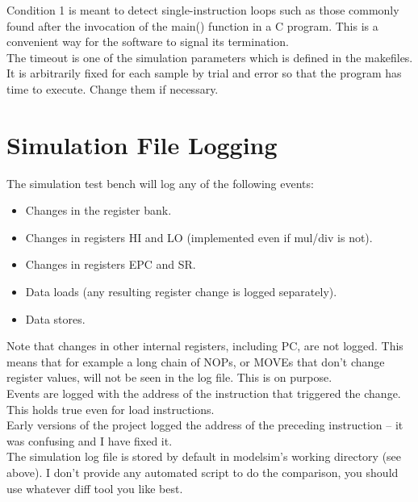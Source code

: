     Condition 1 is meant to detect single-instruction loops such as those
    commonly found after the invocation of the main() function in a C program. 
    This is a convenient way for the software to signal its termination.\\
    
    The timeout is one of the simulation parameters which is defined in
    the makefiles. It is arbitrarily fixed for each sample by trial and error 
    so that the program has time to execute. Change them if necessary.\\
    
\section{Simulation File Logging}
\label{sim_logging}

    The simulation test bench will log any of the following events:

    \begin{itemize}
    \item Changes in the register bank.
    \item Changes in registers HI and LO (implemented even if mul/div is not).
    \item Changes in registers EPC and SR.
    \item Data loads (any resulting register change is logged separately).
    \item Data stores.
    \end{itemize}

    Note that changes in other internal registers, including PC, are not logged.
    This means that for example a long chain of NOPs, or MOVEs that don't change
    register values, will not be seen in the log file. This is on purpose.\\

    Events are logged with the address of the instruction that triggered 
    the change. This holds true even for load instructions.\\
    Early versions of the project logged the address of the 
    preceding instruction -- it was confusing and I have fixed it.\\

    The simulation log file is stored by default in modelsim's working directory
    (see above). I don't provide any automated script to do the comparison, you
    should use whatever diff tool you like best.\\

